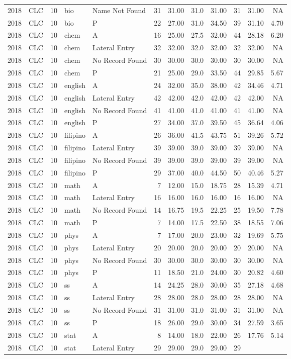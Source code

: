 \documentclass[]{article}
\begin{document}
\begin{longtable}[]{@{}rlrllrrrrrrr@{}}
2018 & CLC & 10 & bio & Name Not Found & 31 & 31.00 & 31.0 & 31.00 & 31
& 31.00 & NA\tabularnewline
2018 & CLC & 10 & bio & P & 22 & 27.00 & 31.0 & 34.50 & 39 & 31.10 &
4.70\tabularnewline
2018 & CLC & 10 & chem & A & 16 & 25.00 & 27.5 & 32.00 & 44 & 28.18 &
6.20\tabularnewline
2018 & CLC & 10 & chem & Lateral Entry & 32 & 32.00 & 32.0 & 32.00 & 32
& 32.00 & NA\tabularnewline
2018 & CLC & 10 & chem & No Record Found & 30 & 30.00 & 30.0 & 30.00 &
30 & 30.00 & NA\tabularnewline
2018 & CLC & 10 & chem & P & 21 & 25.00 & 29.0 & 33.50 & 44 & 29.85 &
5.67\tabularnewline
2018 & CLC & 10 & english & A & 24 & 32.00 & 35.0 & 38.00 & 42 & 34.46 &
4.71\tabularnewline
2018 & CLC & 10 & english & Lateral Entry & 42 & 42.00 & 42.0 & 42.00 &
42 & 42.00 & NA\tabularnewline
2018 & CLC & 10 & english & No Record Found & 41 & 41.00 & 41.0 & 41.00
& 41 & 41.00 & NA\tabularnewline
2018 & CLC & 10 & english & P & 27 & 34.00 & 37.0 & 39.50 & 45 & 36.64 &
4.06\tabularnewline
2018 & CLC & 10 & filipino & A & 26 & 36.00 & 41.5 & 43.75 & 51 & 39.26
& 5.72\tabularnewline
2018 & CLC & 10 & filipino & Lateral Entry & 39 & 39.00 & 39.0 & 39.00 &
39 & 39.00 & NA\tabularnewline
2018 & CLC & 10 & filipino & No Record Found & 39 & 39.00 & 39.0 & 39.00
& 39 & 39.00 & NA\tabularnewline
2018 & CLC & 10 & filipino & P & 29 & 37.00 & 40.0 & 44.50 & 50 & 40.46
& 5.27\tabularnewline
2018 & CLC & 10 & math & A & 7 & 12.00 & 15.0 & 18.75 & 28 & 15.39 &
4.71\tabularnewline
2018 & CLC & 10 & math & Lateral Entry & 16 & 16.00 & 16.0 & 16.00 & 16
& 16.00 & NA\tabularnewline
2018 & CLC & 10 & math & No Record Found & 14 & 16.75 & 19.5 & 22.25 &
25 & 19.50 & 7.78\tabularnewline
2018 & CLC & 10 & math & P & 7 & 14.00 & 17.5 & 22.50 & 38 & 18.55 &
7.06\tabularnewline
2018 & CLC & 10 & phys & A & 7 & 17.00 & 20.0 & 23.00 & 32 & 19.69 &
5.75\tabularnewline
2018 & CLC & 10 & phys & Lateral Entry & 20 & 20.00 & 20.0 & 20.00 & 20
& 20.00 & NA\tabularnewline
2018 & CLC & 10 & phys & No Record Found & 30 & 30.00 & 30.0 & 30.00 &
30 & 30.00 & NA\tabularnewline
2018 & CLC & 10 & phys & P & 11 & 18.50 & 21.0 & 24.00 & 30 & 20.82 &
4.60\tabularnewline
2018 & CLC & 10 & ss & A & 14 & 24.25 & 28.0 & 30.00 & 35 & 27.18 &
4.68\tabularnewline
2018 & CLC & 10 & ss & Lateral Entry & 28 & 28.00 & 28.0 & 28.00 & 28 &
28.00 & NA\tabularnewline
2018 & CLC & 10 & ss & No Record Found & 31 & 31.00 & 31.0 & 31.00 & 31
& 31.00 & NA\tabularnewline
2018 & CLC & 10 & ss & P & 18 & 26.00 & 29.0 & 30.00 & 34 & 27.59 &
3.65\tabularnewline
2018 & CLC & 10 & stat & A & 8 & 14.00 & 18.0 & 22.00 & 26 & 17.76 &
5.14\tabularnewline
2018 & CLC & 10 & stat & Lateral Entry & 29 & 29.00 & 29.0 & 29.00 & 29

\end{longtable}
\end{document}
